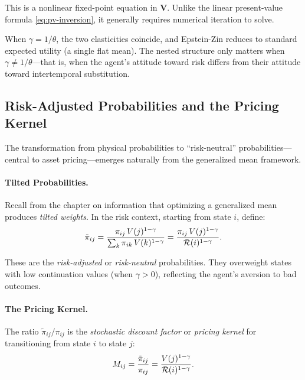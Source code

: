 This is a nonlinear fixed-point equation in $\mathbf{V}$. Unlike the linear present-value formula \eqref{eq:pv-inversion}, it generally requires numerical iteration to solve.

\begin{calloutnote}
When $\gamma = 1/\theta$, the two elasticities coincide, and Epstein-Zin reduces to standard expected utility (a single flat mean). The nested structure only matters when $\gamma \neq 1/\theta$---that is, when the agent's attitude toward risk differs from their attitude toward intertemporal substitution.
\end{calloutnote}

\subsection{Risk-Adjusted Probabilities and the Pricing Kernel}
\label{subsec:risk-adjusted}

The transformation from physical probabilities to ``risk-neutral'' probabilities---central to asset pricing---emerges naturally from the generalized mean framework.

\paragraph{Tilted Probabilities.}
Recall from the chapter on information that optimizing a generalized mean produces \emph{tilted weights}. In the risk context, starting from state $i$, define:
\begin{equation}
\tilde{\pi}_{ij} = \frac{\pi_{ij} \, V(j)^{1-\gamma}}{\sum_k \pi_{ik} \, V(k)^{1-\gamma}} = \frac{\pi_{ij} \, V(j)^{1-\gamma}}{\mathcal{R}(i)^{1-\gamma}}.
\label{eq:tilted-probabilities}
\end{equation}

These are the \emph{risk-adjusted} or \emph{risk-neutral} probabilities. They overweight states with low continuation values (when $\gamma > 0$), reflecting the agent's aversion to bad outcomes.

\paragraph{The Pricing Kernel.}
The ratio $\tilde{\pi}_{ij} / \pi_{ij}$ is the \emph{stochastic discount factor} or \emph{pricing kernel} for transitioning from state $i$ to state $j$:
\begin{equation}
M_{ij} = \frac{\tilde{\pi}_{ij}}{\pi_{ij}} = \frac{V(j)^{1-\gamma}}{\mathcal{R}(i)^{1-\gamma}}.
\label{eq:pricing-kernel}
\end{equation}

